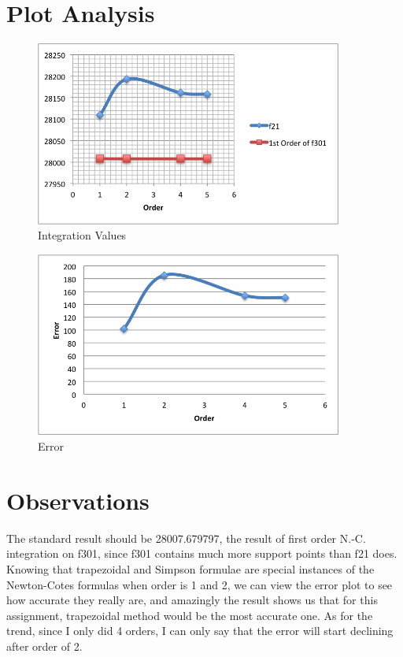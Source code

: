 \documentclass[12pt,a4paper]{article}
\begin{document}
\section{Plot Analysis}

\begin{figure}[h!]
  \centering
     \includegraphics[width=0.9\textwidth]{./trend.png}
  \caption{Integration Values}
\end{figure}
\begin{figure}[h!]
  \centering
     \includegraphics[width=0.9\textwidth]{./error.png}
  \caption{Error}
\end{figure}

\section{Observations}

The standard result should be 28007.679797, the result of first order N.-C. integration on f301, since f301 contains much more support points than f21 does. Knowing that trapezoidal and Simpson formulae are special instances of the Newton-Cotes formulas when order is 1 and 2, we can view the error plot to see how accurate they really are, and amazingly the result shows us that for this assignment, trapezoidal method would be the most accurate one. As for the trend, since I only did 4 orders, I can only say that the error will start declining after order of 2.
\end{document}
